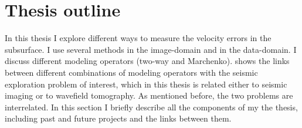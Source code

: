 \newpage
\section{Thesis outline}


In this thesis I explore different ways to measure the velocity errors in the subsurface. I 
use several methods in the image-domain and in the data-domain. I discuss different
modeling operators (two-way and Marchenko).  shows the links between different
combinations of modeling operators with the seismic exploration problem of interest, which
in this thesis is related either to seismic imaging or to wavefield tomography. As 
mentioned before, the two problems are interrelated. In this section I briefly 
describe all the components of my the thesis, including 
past and future projects and the links between them. 

